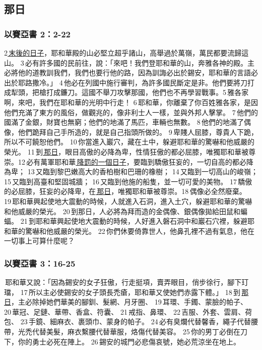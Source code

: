 \subsection{那日}

\subsubsection{以賽亞書 2：2-22}
2\underline{ 末後的日子}，耶和華殿的山必堅立超乎諸山，高舉過於萬嶺，萬民都要流歸這山。 3 必有許多國的民前往，說：「來吧！我們登耶和華的山，奔雅各神的殿。主必將他的道教訓我們，我們也要行他的路，因為訓誨必出於錫安，耶和華的言語必出於耶路撒冷。」 4 他必在列國中施行審判，為許多國民斷定是非。他們要將刀打成犁頭，把槍打成鐮刀。這國不舉刀攻擊那國，他們也不再學習戰事。5 雅各家啊，來吧，我們在耶和華的光明中行走！ 6 耶和華，你離棄了你百姓雅各家，是因他們充滿了東方的風俗，做觀兆的，像非利士人一樣，並與外邦人擊掌。 7 他們的國滿了金銀，財寶也無窮；他們的地滿了馬匹，車輛也無數。 8 他們的地滿了偶像，他們跪拜自己手所造的，就是自己指頭所做的。 9 卑賤人屈膝，尊貴人下跪，所以不可饒恕他們。 10 你當進入巖穴，藏在土中，躲避耶和華的驚嚇和他威嚴的榮光。 11 到\underline{ 那日}，眼目高傲的必降為卑，性情狂傲的都必屈膝，唯獨耶和華被尊崇。12 必有萬軍耶和華\underline{ 降罰的一個日子}，要臨到驕傲狂妄的，一切自高的都必降為卑； 13 又臨到黎巴嫩高大的香柏樹和巴珊的橡樹； 14 又臨到一切高山的峻嶺； 15 又臨到高臺和堅固城牆； 16 又臨到他施的船隻，並一切可愛的美物。 17 驕傲的必屈膝，狂妄的必降卑，在\underline{ 那日}，唯獨耶和華被尊崇。18 偶像必全然廢棄。 19 耶和華興起使地大震動的時候，人就進入石洞，進入土穴，躲避耶和華的驚嚇和他威嚴的榮光。 20 到那日，人必將為拜而造的金偶像、銀偶像拋給田鼠和蝙蝠。 21 到耶和華興起使地大震動的時候，人好進入磐石洞中和巖石穴裡，躲避耶和華的驚嚇和他威嚴的榮光。 22 你們休要倚靠世人，他鼻孔裡不過有氣息，他在一切事上可算什麼呢？


\subsubsection{以賽亞書 3：16-25}
 耶和華又說：「因為錫安的女子狂傲，行走挺項，賣弄眼目，俏步徐行，腳下玎璫， 17 所以主必使錫安的女子頭長禿瘡，耶和華又使她們赤露下體。」 18 到 \underline{那日}，主必除掉她們華美的腳釧、髮網、月牙圈、 19 耳環、手鐲、蒙臉的帕子、 20 華冠、足鏈、華帶、香盒、符囊、 21 戒指、鼻環、 22 吉服、外套、雲肩、荷包、 23 手鏡、細麻衣、裹頭巾、蒙身的帕子。 24 必有臭爛代替馨香，繩子代替腰帶，光禿代替美髮，麻衣繫腰代替華服，烙傷代替美容。 25 你的男丁必倒在刀下，你的勇士必死在陣上。 26 錫安的城門必悲傷哀號，她必荒涼坐在地上。

